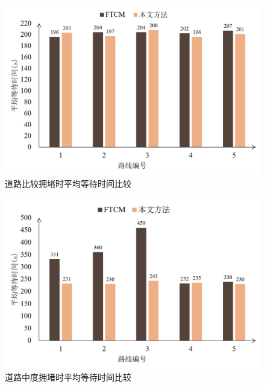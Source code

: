 
\begin{figure}[H]
	\centering
	\includegraphics[width=\linewidth]{figures/awt2.png}
	\caption{道路比较拥堵时平均等待时间比较}
	\label{fig:waiting_relatively_congestion}
\end{figure}
\begin{figure}[H]
	\centering
	\includegraphics[width=\linewidth]{figures/awt3.png}
	\caption{道路中度拥堵时平均等待时间比较}
	\label{fig:waiting_moderate_congestion}
\end{figure}
